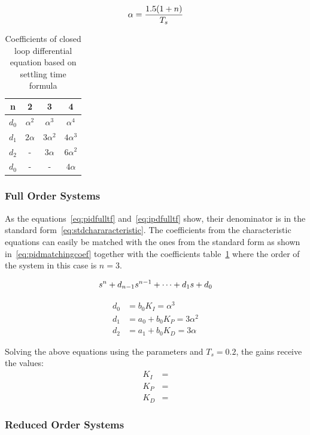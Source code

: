 \begin{equation}
\centering
\label{eq:settling}
\alpha = \dfrac{1.5(1 + n)}{T_s}
\end{equation}

\begin{table}[!h]
	\label{tb:coefsettlingtime}
	\caption{ Coefficients of
		closed loop differential
		equation based on settling
		time formula\cite{feedback}}
	\centering
	\begin{tabular}{|c|c|c|c|}
		\hline
		n & 2 & 3 & 4\\
		\hline
		$d_0$ & $\alpha^2$ & $\alpha^3$ & $\alpha^4$\\ 
		$d_1$ & $2\alpha$ & $3\alpha^2$ & $4\alpha^3$\\
		$d_2$ & - & $3\alpha$ & $6\alpha^2$\\
		$d_0$ & - & - & $4\alpha$\\
		\hline	
		
	\end{tabular}
\end{table}


\subsubsection{Full Order Systems}

As the equations~\ref{eq:pidfulltf} and~\ref{eq:ipdfulltf} show, their denominator is in the standard form~\ref{eq:stdchararacteristic}. The coefficients from the characteristic equations can easily be matched with the ones from the standard form as shown in~\ref{eq:pidmatchingcoef} together with the coefficients table~\ref{tb:coefsettlingtime} where the order of the system in this case is $n=3$. 


\begin{equation}
\centering
\label{eq:stdchararacteristic}
s^n + d_{n-1}s^{n-1} + \cdots + d_1 s + d_0 
\end{equation}

\begin{align}
\label{eq:pidmatchingcoef}
d_0 &= b_0 K_I = \alpha^3
\\
d_1 &= a_0 + b_0 K_P = 3\alpha^2
\\
d_2 &= a_1 + b_0 K_D = 3\alpha
\end{align}

Solving the above equations using the parameters and $T_s=0.2$, the gains receive the values:
\begin{align*}
\label{eq:gainsvaluesfull}
K_I &= 
\\
K_P &= 
\\
K_D &= 
\end{align*}


\subsubsection{Reduced Order Systems}


